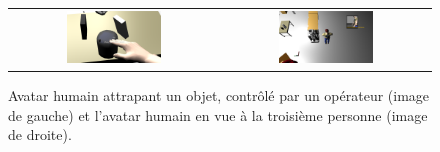 \documentclass[a4paper,11pt,twoside]{StyleThese}
\begin{document}



\begin{figure}[ht!]
 \centering
 \begin{tabular}{cc}
  \includegraphics[width=0.475\textwidth]{img/Screenshot_from_2014-04-29_14_02_14.png} &
  \includegraphics[width=0.475\textwidth]{img/Screenshot_from_2014-04-29_14_21_24.png}
 \end{tabular}
 \caption{Avatar humain attrapant un objet, contrôlé par un opérateur (image de gauche) et l'avatar humain en vue à la troisième personne (image de droite).}
 \label{fig:human_morse}
 \end{figure}
\end{document}
